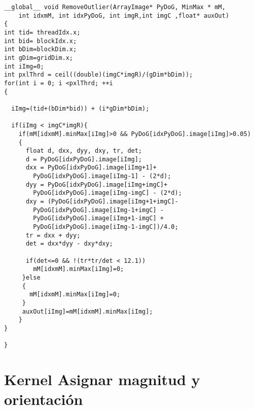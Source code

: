 \begin{small}
\begin{lstlisting}
__global__ void RemoveOutlier(ArrayImage* PyDoG, MinMax * mM,
	int idxmM, int idxPyDoG, int imgR,int imgC ,float* auxOut)
{
int tid= threadIdx.x;
int bid= blockIdx.x;
int bDim=blockDim.x;
int gDim=gridDim.x;
int iImg=0;
int pxlThrd = ceil((double)(imgC*imgR)/(gDim*bDim)); 
for(int i = 0; i <pxlThrd; ++i 
{

  iImg=(tid+(bDim*bid)) + (i*gDim*bDim); 
		
  if(iImg < imgC*imgR){
	if(mM[idxmM].minMax[iImg]>0 && PyDoG[idxPyDoG].image[iImg]>0.05)
	{
	  float d, dxx, dyy, dxy, tr, det;
	  d = PyDoG[idxPyDoG].image[iImg];
	  dxx = PyDoG[idxPyDoG].image[iImg+1]+
	  	PyDoG[idxPyDoG].image[iImg-1] - (2*d);
	  dyy = PyDoG[idxPyDoG].image[iImg+imgC]+
	  	PyDoG[idxPyDoG].image[iImg-imgC] - (2*d);
	  dxy = (PyDoG[idxPyDoG].image[iImg+1+imgC]-
	  	PyDoG[idxPyDoG].image[iImg-1+imgC] - 
	  	PyDoG[idxPyDoG].image[iImg+1-imgC] +
	  	PyDoG[idxPyDoG].image[iImg-1-imgC])/4.0;
	  tr = dxx + dyy;
	  det = dxx*dyy - dxy*dxy;
		
	  if(det<=0 && !(tr*tr/det < 12.1))
	    mM[idxmM].minMax[iImg]=0;
	 }else
	 {
	   mM[idxmM].minMax[iImg]=0;
	 }
     auxOut[iImg]=mM[idxmM].minMax[iImg];
	}
}
	
}
\end{lstlisting}

\end{small}
\pagebreak

\chapter{Kernel Asignar magnitud y orientación}

